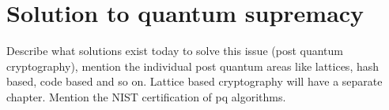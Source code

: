 \chapter{Solution to quantum supremacy}

Describe what solutions exist today to solve this issue (post quantum cryptography), mention the individual post quantum areas like lattices, hash based, code based and so on. Lattice based cryptography will have a separate chapter. Mention the NIST certification of pq algorithms.